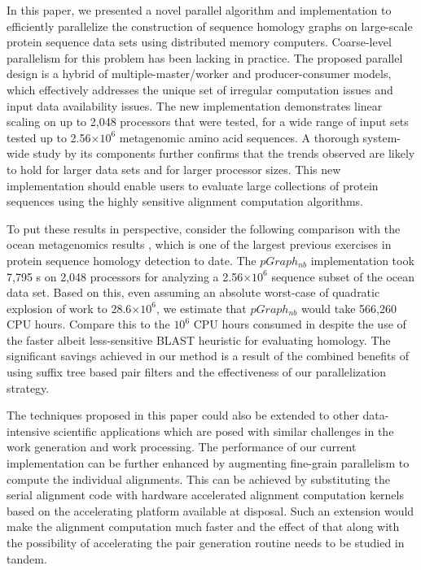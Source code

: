 \documentclass[10pt,journal,letterpaper,compsoc]{IEEEtran}
\begin{document}
In this paper, we presented a novel parallel algorithm and implementation to efficiently parallelize the construction of sequence homology graphs on large-scale protein sequence data sets using distributed memory computers. Coarse-level parallelism for this problem has been lacking in practice. The proposed parallel design is a hybrid of multiple-master/worker and producer-consumer models, which effectively addresses the unique set of irregular computation issues and input data availability issues. The new implementation demonstrates linear scaling on up to 2,048 processors that were tested, for a wide range of input sets tested up to 2.56$\times 10^6$ metagenomic amino acid sequences. A thorough system-wide study by its components further confirms that the trends observed are likely to hold for larger data sets and for larger processor sizes. This new implementation should enable users to evaluate large collections of protein sequences using the highly sensitive alignment computation algorithms. 

To put these results in perspective, consider the following comparison with the ocean metagenomics results \cite{Yooseph07}, which is one of the largest previous exercises in protein sequence homology detection to date. The $pGraph_{nb}$ implementation took 7,795 s on 2,048 processors for analyzing a 2.56$\times 10^6$ sequence subset of the ocean data set. Based on this, even assuming an absolute worst-case of quadratic explosion of work to 28.6$\times 10^6$, we estimate that $pGraph_{nb}$ would take 566,260 CPU hours. Compare this to the $10^6$ CPU hours consumed in \cite{Yooseph07} despite the use of  the faster albeit less-sensitive BLAST heuristic for evaluating homology. The significant savings achieved in our method is a result of the combined benefits of using suffix tree based pair filters and the effectiveness of our parallelization strategy.

The techniques proposed in this paper could also be extended to other data-intensive scientific applications which are posed with similar challenges in the work generation and work processing. The performance of our current implementation can be further enhanced by augmenting fine-grain parallelism to compute the individual alignments. This can be achieved by substituting the serial alignment code with hardware accelerated alignment computation kernels based on the accelerating platform available at disposal. Such an extension would make the alignment computation much faster and the effect of that along with the possibility of accelerating the pair generation routine needs to be studied in tandem.
\end{document}
